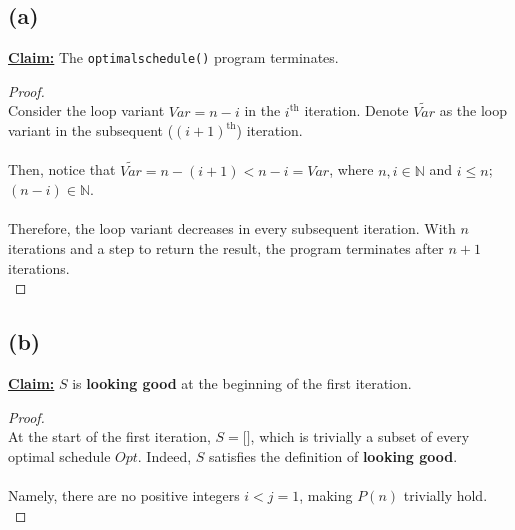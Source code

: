 \documentclass[12pt]{article}
\begin{document}
\subsection*{(a)}
\underline{\textbf{Claim:}} The \texttt{optimalschedule()} program terminates.
\begin{proof}
\leavevmode\\
    Consider the loop variant \( Var = n - i \) in the \( i^{\text{th}} \) iteration. Denote \( \widetilde{Var} \) as the loop variant in the subsequent (\( (i + 1)^{\text{th}} \)) iteration. \\
    \\
    Then, notice that \( \widetilde{Var} = n - (i + 1) < n - i = Var \), where \( n, i \in \mathbb{N} \) and \( i \leq n \); \( (n - i) \in \mathbb{N} \). \\
    \\
    Therefore, the loop variant decreases in every subsequent iteration. With \( n \) iterations and a step to return the result, the program terminates after \( n + 1 \) iterations. \\ 
\end{proof}
\subsection*{(b)}
\underline{\textbf{Claim:}} \( S \) is \textbf{looking good} at the beginning of the first iteration.
\begin{proof}
\leavevmode\\
    At the start of the first iteration, \( S = \texttt{[]} \), which is trivially a subset of every optimal schedule \( Opt \). Indeed, \( S \) satisfies the definition of \textbf{looking good}. \\
    \\
    Namely, there are no positive integers \( i < j = 1 \), making \( P(n) \) trivially hold. \\
\end{proof}
\end{document}
